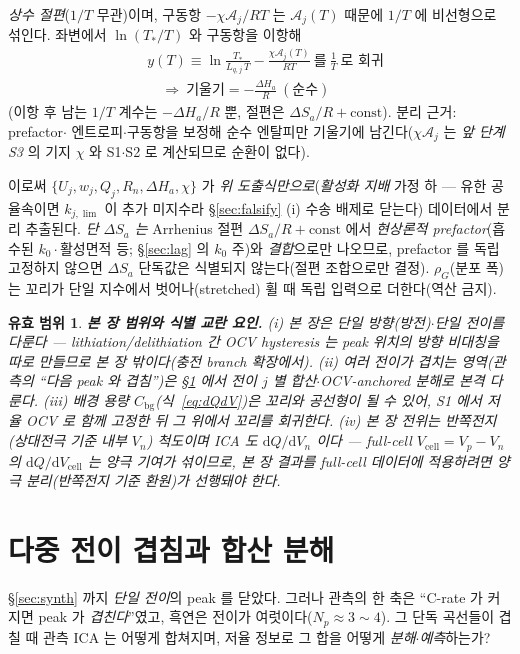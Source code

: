 \documentclass[11pt,a4paper]{article}
\newtheorem*{boundbox}{유효 범위}
\newcommand{\dd}{\mathrm{d}}
\newcommand{\cell}{\mathrm{cell}}
\newcommand{\bg}{\mathrm{bg}}
\begin{document}
\begin{enumerate}[label=\textbf{S\arabic*.},leftmargin=2.6em,itemsep=2pt]
  \emph{상수 절편}($1/T$ 무관)이며, 구동항 $-\chi\mathcal A_j/RT$ 는 $\mathcal A_j(T)$ 때문에 $1/T$ 에 비선형으로
  섞인다. 좌변에서 $\ln(T_*/T)$ 와 구동항을 이항해
  \begin{equation}
  \boxed{\;\begin{aligned}
  &y(T)\equiv\ln\frac{T_*}{L_{q,j}\,T}-\frac{\chi\mathcal A_j(T)}{RT}\ \text{를}\ \tfrac1T\ \text{로 회귀}\\[2pt]
  &\quad\Rightarrow\ \text{기울기}=-\frac{\Delta H_a}{R}\ (\text{순수})
  \end{aligned}\;}
  \label{eq:arrhenius}
  \end{equation}
  (이항 후 남는 $1/T$ 계수는 $-\Delta H_a/R$ 뿐, 절편은 $\Delta S_a/R+\text{const}$). 분리 근거: prefactor$\cdot$
  엔트로피$\cdot$구동항을 보정해 순수 엔탈피만 기울기에 남긴다($\chi\mathcal A_j$ 는 \emph{앞 단계 S3} 의 기지 $\chi$ 와
  S1$\cdot$S2 로 계산되므로 순환이 없다).
\end{enumerate}
이로써 $\{U_j,w_j,Q_j,R_n,\Delta H_a,\chi\}$ 가 \emph{위 도출식만으로}(\emph{활성화 지배} 가정 하 — 유한 공율속이면
$k_{j,\lim}$ 이 추가 미지수라 \S\ref{sec:falsify} (i) 수송 배제로 닫는다) 데이터에서 분리 추출된다. \emph{단 $\Delta S_a$ 는}
Arrhenius 절편 $\Delta S_a/R+\text{const}$ 에서 \emph{현상론적 prefactor}(흡수된 $k_0\cdot$활성면적 등; \S\ref{sec:lag} 의
$k_0$ 주)와 \emph{결합}으로만 나오므로, prefactor 를 독립 고정하지 않으면 $\Delta S_a$ 단독값은 식별되지 않는다(절편
조합으로만 결정). $\rho_G$(분포 폭)는 꼬리가 단일 지수에서 벗어나(stretched) 휠 때 독립 입력으로 더한다(역산 금지).
\begin{boundbox}
\textbf{본 장 범위와 식별 교란 요인.} (i) 본 장은 \emph{단일 방향}(방전)$\cdot$단일 전이를 다룬다 —
lithiation/delithiation 간 OCV hysteresis 는 peak 위치의 방향 비대칭을 따로 만들므로 본 장 밖이다(충전 branch
확장에서). (ii) 여러 전이가 겹치는 영역(관측의 ``다음 peak 와 겹침'')은 \S\ref{sec:overlap} 에서 전이 $j$ 별
합산$\cdot$OCV-anchored 분해로 본격 다룬다. (iii) 배경 용량 $C_\bg$(식~\eqref{eq:dQdV})은 꼬리와 공선형이
될 수 있어, S1 에서 저율 OCV 로 함께 고정한 뒤 그 위에서 꼬리를 회귀한다. (iv) 본 장 전위는 \emph{반쪽전지}(상대전극
기준 내부 $V_n$) 척도이며 ICA 도 $\dd Q/\dd V_n$ 이다 — full-cell $V_\cell=V_p-V_n$ 의 $\dd Q/\dd V_\cell$ 는 양극
기여가 섞이므로, 본 장 결과를 full-cell 데이터에 적용하려면 양극 분리(반쪽전지 기준 환원)가 선행돼야 한다.
\end{boundbox}

\section{다중 전이 겹침과 합산 분해}\label{sec:overlap}
\S\ref{sec:synth} 까지 \emph{단일 전이}의 peak 를 닫았다. 그러나 관측의 한 축은 ``C-rate 가 커지면 peak 가
\emph{겹친다}''였고, 흑연은 전이가 여럿이다($N_p\approx3\sim4$). 그 단독 곡선들이 겹칠 때 관측 ICA 는 어떻게
합쳐지며, 저율 정보로 그 합을 어떻게 \emph{분해$\cdot$예측}하는가?
\end{document}
